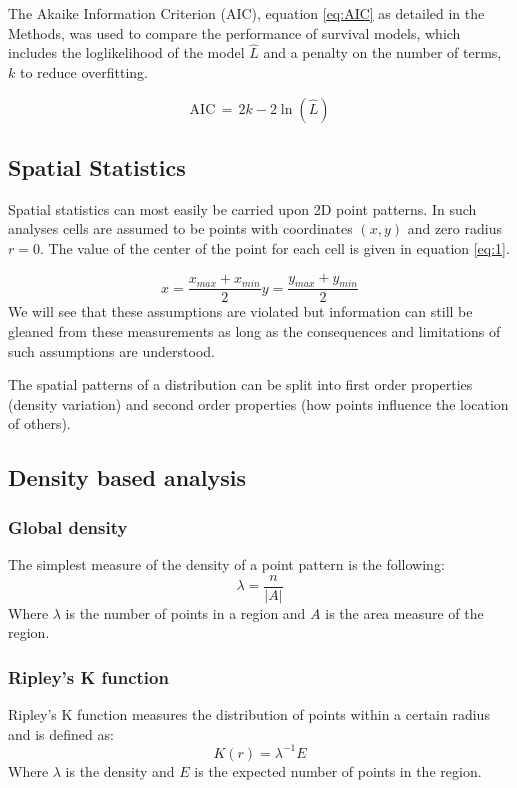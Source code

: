 The Akaike Information Criterion (AIC), equation \ref{eq:AIC} as detailed in the Methods, was used to compare the performance of survival models, which includes the loglikelihood of the model $\hat{L}$ and a penalty on the number of terms, $k$ to reduce overfitting. 

\begin{equation}
\label{eq:AIC}
    {\displaystyle \mathrm {AIC} \,=\,2k-2\ln({\hat {L}})}
\end{equation}

\subsection{Spatial Statistics}

Spatial statistics can most easily be carried upon 2D point patterns. In such analyses cells are assumed to be points with coordinates $(x,y)$ and zero radius $r=0$. The value of the center of the point for each cell is given in equation \ref{eq:1}. 

\begin{equation}    x=\frac{x_{max} + x_{min}}{2}        y = \frac{y_{max} + y_{min}}{2}
\label{eq:1}
\end{equation}
We will see that these assumptions are violated but information can still be gleaned from these measurements as long as the consequences and limitations of such assumptions are understood.

The spatial patterns of a distribution can be split into first order properties (density variation) and second order properties (how points influence the location of others).

\subsection{Density based analysis}

\subsubsection{Global density}
The simplest measure of the density of a point pattern is the following:
\begin{equation}
    \lambda = \frac{n}{|A|}
\end{equation}
Where $\lambda$ is the number of points in a region and $A$ is the area measure of the region. 

\subsubsection{Ripley's K function}
Ripley's K function measures the distribution of points within a certain radius and is defined as:
\begin{equation}
K(r)=\lambda^{-1}E
\end{equation}
Where $\lambda$ is the density and $E$ is the expected number of points in the region.

